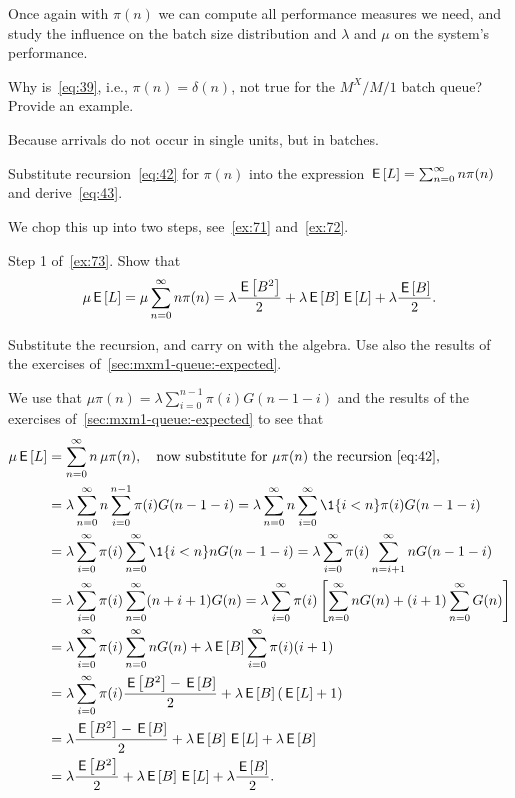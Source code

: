 Once again with $\pi(n)$ we can compute all performance measures we need, and study the influence on the batch size distribution and $\lambda$ and $\mu$ on the system's performance.

\begin{exercise}
 Why is~\cref{eq:39}, i.e., $\pi(n)=\delta(n)$, not true for the $M^X/M/1$ batch queue?
 Provide an example.
\begin{solution}
 Because arrivals do not occur in single units, but in batches.
\end{solution}
\end{exercise}

\begin{exercise}
 Substitute recursion~\cref{eq:42} for $\pi(n)$ into the expression $\,\mathsf{E}\left[L\right] = \sum_{n=0}^\infty n \pi(n)$ and derive~\cref{eq:43}.
\begin{solution}
 We chop this up into two steps, see~\cref{ex:71} and~\cref{ex:72}.
\end{solution}
\end{exercise}

\begin{extra}
 Step 1 of~\cref{ex:73}.
 Show that
\begin{equation}\label{eq:67}
 \mu \,\mathsf{E}\left[L\right] =\mu \sum_{n=0}^\infty n \pi(n) = \lambda \frac{\,\mathsf{E}\left[B^2\right]}2 + \lambda \,\mathsf{E}\left[B\right] \,\mathsf{E}\left[L\right] +\lambda \frac{\,\mathsf{E}\left[B\right]}2.
\end{equation}
\begin{hint}
 Substitute the recursion, and carry on with the algebra.
 Use also the results of the exercises of~\cref{sec:mxm1-queue:-expected}.
\end{hint}
\begin{solution}
 We use that $\mu \pi(n) =\lambda \sum_{i=0}^{n-1} \pi(i) G(n-1-i)$ and the results of the exercises of~\cref{sec:mxm1-queue:-expected} to see that
\begin{align*}
 \mu \E L
 &=\sum_{n=0}^\infty n\, \mu \pi(n), \quad \text{now substitute for $\mu \pi(n)$ the recursion~\cref{eq:42}}, \\
& =\lambda \sum_{n=0}^\infty n \sum_{i=0}^{n-1} \pi(i) G(n-1-i) 
 =\lambda \sum_{n=0}^\infty n \sum_{i=0}^\infty \1{i<n} \pi(i) G(n-1-i) \\
& =\lambda \sum_{i=0}^\infty \pi(i) \sum_{n=0}^\infty \1{i<n} n G(n-1-i) 
 =\lambda \sum_{i=0}^\infty \pi(i) \sum_{n=i+1}^\infty n G(n-1-i) \\
& =\lambda \sum_{i=0}^\infty \pi(i) \sum_{n=0}^\infty (n+i+1) G(n) 
 =\lambda \sum_{i=0}^\infty \pi(i) \left[\sum_{n=0}^\infty n G(n) +(i+1) \sum_{n=0}^\infty G(n)\right] \\
 &=\lambda \sum_{i=0}^\infty \pi(i)\sum_{n=0}^\infty n G(n) +\lambda \E B \sum_{i=0}^\infty \pi(i) (i+1) \\ 
 &=\lambda \sum_{i=0}^\infty \pi(i) \frac{\E{B^2} -\E B}2 + \lambda \E B (\E L +1) \\ 
 &= \lambda \frac{\E{B^2} -\E B}2 + \lambda \E B \E L +\lambda \E B \\
 &= \lambda \frac{\E{B^2} }2 + \lambda \E B \E L +\lambda \frac{\E B}2.
\end{align*}
\end{solution}
\end{extra}

